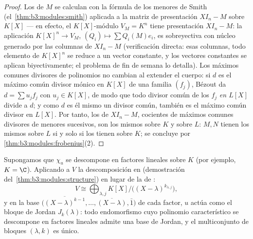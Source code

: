 \begin{proof}
Los  de $M$
se calculan con la fórmula de los menores de Smith
(el~\cref{thm:b3:modules:smith}) aplicada a la matriz de presentación
$XI_n - M$ sobre $K[X]$ --- en efecto, el $K[X]$-módulo $V_M = K^n$
tiene presentación $XI_n - M$: la aplicación $K[X]^n \to V_M$,
$(Q_i) \mapsto \sum Q_i(M)e_i$, es sobreyectiva con núcleo generado por
las columnas de $XI_n - M$ (verificación directa:  esas columnas,
todo elemento de $K[X]^n$ se reduce a un vector constante, y los
vectores constantes se aplican biyectivamente; el problema de fin de
semana lo detalla). Los máximos comunes divisores de polinomios no
cambian al extender el cuerpo: si $d$ es el máximo común divisor mónico
en $K[X]$ de una familia $(f_j)$, Bézout da $d = \sum u_jf_j$ con
$u_j \in K[X]$, de modo que todo divisor común de los $f_j$ \emph{en
$L[X]$} divide a $d$; y como $d$ es él mismo un divisor común, también
es el máximo común divisor en $L[X]$. Por tanto, los
 de $XI_n - M$,
cocientes de máximos comunes divisores de menores sucesivos, son los
mismos sobre $K$ y sobre $L$: $M, N$ tienen los mismos
 sobre $L$ si
y solo si los tienen sobre $K$; se concluye por
\cref{thm:b3:modules:frobenius}(2).
\end{proof}

\begin{theorem}\label{thm:b3:modules:jordan}
Supongamos que $\chi_u$ se descompone en factores lineales sobre $K$
(por ejemplo, $K = \C$). Aplicando a $V$ la descomposición en  (demostración del~\cref{thm:b3:modules:structure}) en lugar
de la de :
\[
V \cong \bigoplus_{\lambda, j} K[X]\big/\bigl((X -
\lambda)^{k_{\lambda,j}}\bigr),
\]
y en la base $\bigl(\overline{(X-\lambda)^{k-1}}, \dots,
\overline{(X - \lambda)}, \bar 1\bigr)$ de cada factor, $u$ actúa como
el bloque de Jordan $J_k(\lambda)$: todo endomorfismo cuyo polinomio
característico se descompone en factores lineales admite una base de
Jordan, y el multiconjunto de bloques $(\lambda, k)$ es
único.
\end{theorem}

